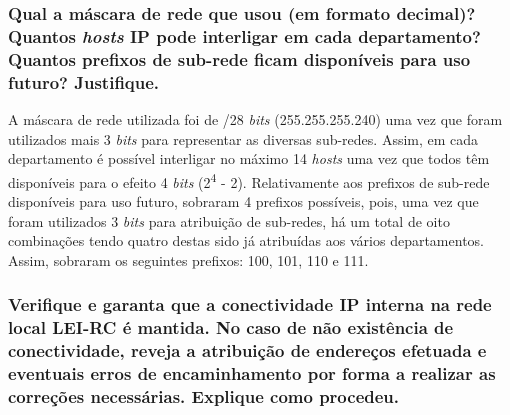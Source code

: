     
    
    
\paragraph{}    
\subsubsection{Qual a máscara de rede que usou (em formato decimal)? Quantos \textit{hosts} IP pode interligar em cada departamento? Quantos prefixos de sub-rede ficam disponíveis para uso futuro? Justifique.}

    \par A máscara de rede utilizada foi de /28 \textit{bits} (255.255.255.240) uma vez que foram utilizados mais 3 \textit{bits} para representar as diversas sub-redes. Assim, em cada departamento é possível interligar no máximo 14 \textit{hosts} uma vez que todos têm disponíveis para o efeito 4 \textit{bits} (2\textsuperscript{4} - 2). Relativamente aos prefixos de sub-rede disponíveis para uso futuro, sobraram 4 prefixos possíveis, pois, uma vez que foram utilizados 3 \textit{bits} para atribuição de sub-redes, há um total de oito combinações tendo quatro destas sido já atribuídas aos vários departamentos. Assim, sobraram os seguintes prefixos: 100, 101, 110 e 111.
    
    
    

\newpage
\subsubsection{Verifique e garanta que a conectividade IP interna na rede local LEI-RC é mantida. No caso de não existência de conectividade, reveja a atribuição de endereços efetuada e eventuais erros de encaminhamento por forma a realizar as correções necessárias. Explique como procedeu.}

    \paragraph{}
